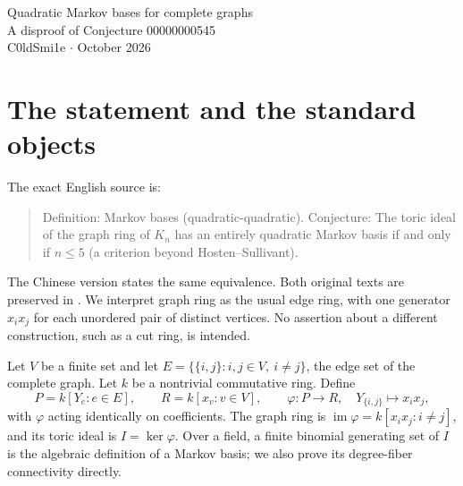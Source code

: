 \documentclass[11pt,letterpaper]{article}
\newcommand{\ee}[2]{\{#1,#2\}}
\newcommand{\code}[1]{\texttt{\small\detokenize{#1}}}
\begin{document}
\begin{center}
{\LARGE Quadratic Markov bases for complete graphs}\\[0.45em]
{\large A disproof of Conjecture 00000000545}\\[0.55em]
C0ldSmi1e \quad $\cdot$  October 2026
\end{center}

\begin{abstract}
Under the standard edge-ring interpretation of graph ring, the proposed
cutoff at five vertices is false. We prove that the toric ideal of every
finite complete graph is generated by a finite set of nonzero quadratic
binomials. The proof connects every degree fiber by replacements of two
edges, with unrestricted edge multiplicities, and then establishes generation
of the full polynomial kernel. The argument works over every nontrivial
commutative ring, hence over every field. In particular, $K_6$ is a
counterexample. The accompanying Lean 4 project checks the entire argument.
\end{abstract}

\section{The statement and the standard objects}
The exact English source is:
\begin{quote}
Definition: Markov bases (quadratic-quadratic). Conjecture: The toric ideal
of the graph ring of $K_n$ has an entirely quadratic Markov basis if and
only if $n\leq 5$ (a criterion beyond Hosten--Sullivant).
\end{quote}
The Chinese version states the same equivalence. Both original texts are
preserved in \code{ORIGINAL.md}. We interpret graph ring as the usual edge
ring, with one generator $x_i x_j$ for each unordered pair of distinct
vertices. No assertion about a different construction, such as a cut ring,
is intended.

Let $V$ be a finite set and let
$E=\{\ee{i}{j}:i,j\in V,\ i\ne j\}$, the edge set of the complete graph.
Let $k$ be a nontrivial commutative ring. Define
\[
 P=k[Y_e:e\in E],\qquad R=k[x_v:v\in V],\qquad
 \varphi:P\longrightarrow R,\quad Y_{\ee{i}{j}}\longmapsto x_i x_j,
\]
with $\varphi$ acting identically on coefficients. The graph ring is
$\operatorname{im}\varphi=k[x_i x_j:i\ne j]$, and its toric ideal is
$I=\ker\varphi$. Over a field, a finite binomial generating set of $I$ is
the algebraic definition of a Markov basis; we also prove its degree-fiber
connectivity directly.
\end{document}
